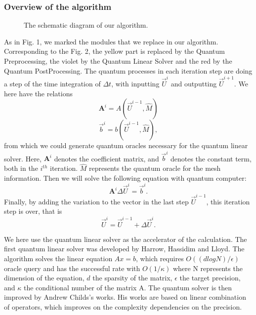\documentclass[%
 reprint,
 amsmath,amssymb,
pra,
]{revtex4-1}
\begin{document}
\subsubsection{Overview of the algorithm}

\begin{figure}[htbp]
    \caption{The schematic diagram of our algorithm. }
    \label{QuantumProcess1} 
\end{figure}

As in Fig. 1, we marked the modules that we replace in our algorithm. Corresponding to the Fig. 2, the yellow part is replaced by the Quantum Preprocessing, the violet by the Quantum Linear Solver and the red by the Quantum PostProcessing. The quantum processes in each iteration step are doing a step of the time integration of $\Delta t$, with inputting $\vec{U}^i$ and outputting $\vec{U}^{i+1}$. We here have the relations
$$
\bm{A}^i=A(\vec{U}^{i-1},\hat{M})
$$
$$
\vec{b}^i=b(\vec{U}^{i-1},\hat{M}),
$$ from which we could generate quantum oracles necessary for the quantum linear solver. Here, $\bm{A}^i$ denotes the coefficient matrix, and $\vec{b}^i$ denotes the constant term, both in the $i^{th}$ iteration. $\hat{M}$ represents the quantum oracle for the mesh information. Then we will solve the following equation with quantum computer:
$$
\bm{A}^i\Delta \vec{U}^i=\vec{b}^i.
$$
Finally, by adding the variation to the vector in the last step $\vec{U}^{i-1}$, this iteration step is over, that is
$$
\vec{U}^i=\vec{U}^{i-1}+\Delta \vec{U}^i.
$$

We here use the quantum linear solver as the accelerator of the calculation. The first quantum linear solver was developed by Harrow, Hassidim and Lloyd. The algorithm solves the linear equation $Ax = b$, which requires $O((d log⁡N)/\epsilon)$ oracle query and has the successful rate with $O(1/\kappa)$ where N represents the dimension of the equation, $d$ the sparsity of the matrix, $\epsilon$ the target precision, and $\kappa$ the conditional number of the matrix A. The quantum solver is then improved by Andrew Childs’s works. His works are based on linear combination of operators, which improves on the complexity dependencies on the precision.
\end{document}
